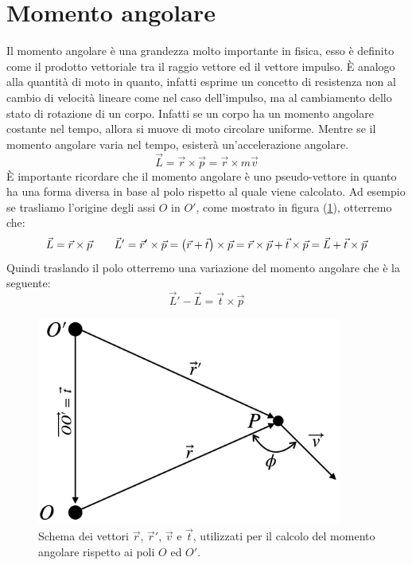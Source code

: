 \section{Momento angolare}
Il momento angolare è una grandezza molto importante in fisica, esso è
definito come il prodotto vettoriale tra il raggio vettore ed il vettore
impulso. È analogo alla quantità di moto in quanto, infatti esprime un
concetto di resistenza non al cambio di velocità lineare come nel caso
dell'impulso, ma al cambiamento dello stato di rotazione di un corpo.
Infatti se un corpo ha un momento angolare costante nel tempo, allora si
muove di moto circolare uniforme. Mentre se il momento angolare varia nel
tempo, esisterà un'accelerazione angolare.
\begin{equation}
    \boxed{\vec L = \vec r \times \vec p = \vec r \times m\vec v}
\label{eq:momentum:L_def}
\end{equation}
È importante ricordare che il momento angolare è uno pseudo-vettore in quanto
ha una forma diversa in base al polo rispetto al quale viene calcolato.
Ad esempio se trasliamo l'origine degli assi $O$ in $O'$, come mostrato in
figura (\ref{fig:momentum:pole_change}), otterremo che:
\begin{equation}
    \vec L = \vec r \times \vec p\quad \quad \vec L' = \vec r '\times\vec p =
    \left(\vec r + \vec t\right)\times \vec p = \vec r \times \vec p + \vec t\times
    \vec p = \vec L + \vec t\times\vec p
\end{equation}
Quindi traslando il polo otterremo una variazione del momento angolare che è
la seguente:
\begin{equation}
    \boxed{\vec L'-\vec L = \vec t\times\vec p}
\label{eg:momentum:L_pole_change}
\end{equation}
\begin{figure}[htbp]
    \begin{center}
        \includegraphics[width=10cm]{images/momang1.png}
        \caption{Schema dei vettori $\vec r$, $\vec r'$, $\vec v$ e $\vec t$,
        utilizzati per il calcolo del momento angolare rispetto ai poli $O$ ed
        $O'$.}
\label{fig:momentum:pole_change}
\end{center}
\end{figure}
